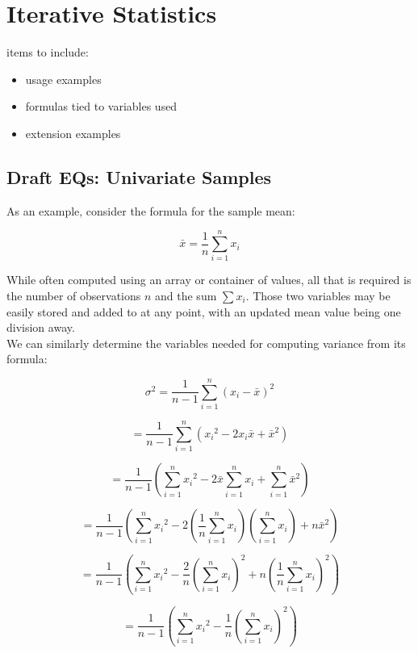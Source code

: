 \documentclass{article}
\begin{document}


\section*{Iterative Statistics}

items to include:

\begin{itemize}
\item usage examples
\item formulas tied to variables used
\item extension examples
\end{itemize}


\subsection*{Draft EQs: Univariate Samples}


As an example, consider the formula for the sample mean:

$$\bar{x} = \frac{1}{n}\sum_{i=1}^n x_i$$

While often computed using an array or container of values, all that is required is the number of observations $n$ and the sum $\sum x_i$. Those two variables may be easily stored and added to at any point, with an updated mean value being one division away.\\

We can similarly determine the variables needed for computing variance from its formula:

$$\sigma^2=\frac{1}{n-1}\sum_{i=1}^n \left(x_i - \bar{x}\right)^2$$

$$=\frac{1}{n-1}\sum_{i=1}^n \left({x_i}^2 - 2x_i\bar{x} + \bar{x}^2 \right)$$

$$=\frac{1}{n-1} \left( \sum_{i=1}^n {x_i}^2 - 2\bar{x}\sum_{i=1}^n x_i + \sum_{i=1}^n \bar{x}^2 \right)$$

$$=\frac{1}{n-1} \left( \sum_{i=1}^n {x_i}^2 - 2\left(\frac{1}{n}\sum_{i=1}^n x_i\right)\left(\sum_{i=1}^n x_i\right) + n\bar{x}^2 \right)$$

$$=\frac{1}{n-1} \left( \sum_{i=1}^n {x_i}^2 - \frac{2}{n}\left(\sum_{i=1}^n x_i\right)^2 + n\left(\frac{1}{n}\sum_{i=1}^n x_i\right)^2 \right)$$

$$=\frac{1}{n-1} \left( \sum_{i=1}^n {x_i}^2 - \frac{1}{n}\left(\sum_{i=1}^n x_i\right)^2 \right)$$
\end{document}
